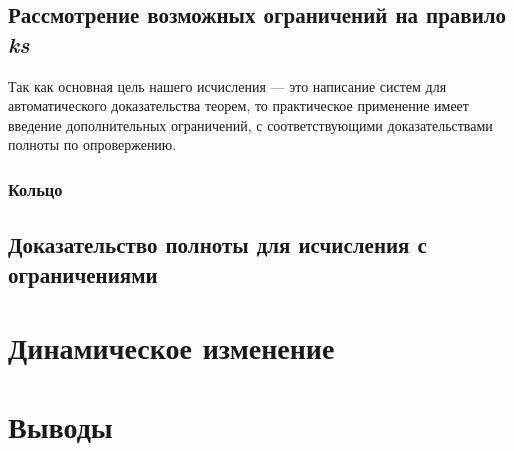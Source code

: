 \subsection{Рассмотрение возможных ограничений на правило \emph{ks}}
\label{sec:restr}

Так как основная цель нашего исчисления --- это написание систем для автоматического доказательства теорем, то практическое применение имеет введение дополнительных ограничений, с соответствующими доказательствами полноты по опровержению.

\subsubsection{Кольцо}

\subsection{Доказательство полноты для исчисления с ограничениями}

\section{Динамическое изменение}
\label{sec:onlineChanging}

\section{Выводы}
